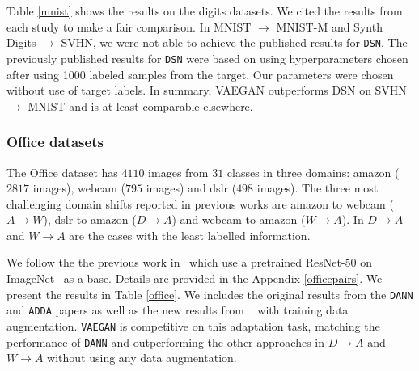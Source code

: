 \documentclass{article}
\newcommand{\markw}[1]{\textbf{\color{green}Mark: #1}}
\begin{document}
 

Table \ref{mnist} shows the results on the digits datasets. We cited the results from each study to make a fair comparison. In MNIST $\rightarrow$ MNIST-M and Synth Digits $\rightarrow$ SVHN,  we were not able to achieve the published results for \verb "DSN".  The previously published results for \verb "DSN" were based on using hyperparameters chosen after using 1000 labeled samples from the target.  Our parameters were chosen without use of target labels. %
In summary, VAEGAN outperforms DSN on SVHN $\rightarrow$ MNIST and is at least comparable elsewhere. %


\subsubsection{Office datasets}
The Office dataset has $4110$ images from $31$ classes in three domains: amazon ($2817$ images), webcam ($795$ images) and dslr ($498$ images). The three most challenging domain shifts reported in previous works are amazon to webcam ($A\rightarrow W$), dslr to amazon ($D \rightarrow A$) and webcam to amazon ($W \rightarrow A$). In $D \rightarrow A$ and $W \rightarrow A$  are the cases with the least labelled information. 

We follow the the previous work in~\cite{tzeng2017adversarial, chen2020adversarial} which use a pretrained ResNet-50 on ImageNet~\cite{deng2009imagenet} as a base. Details are provided in the Appendix \ref{officepairs}. We present the results in Table \ref{office}. We includes the original results from the \verb"DANN" and \verb"ADDA" papers as well as the new results from ~\cite{chen2020adversarial} with training data augmentation. \verb"VAEGAN" is competitive on this adaptation task, matching the performance of \verb"DANN" and outperforming the other approaches in $D \rightarrow A$ and $W \rightarrow A$ without using any data augmentation. 
\end{document}
